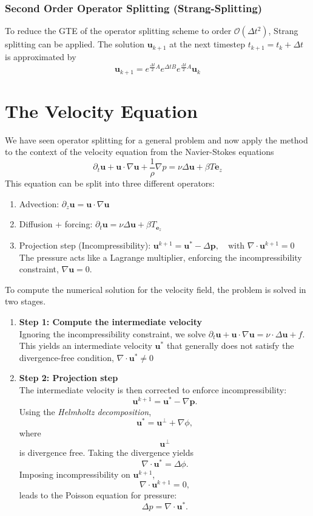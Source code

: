 \subsubsection{Second Order Operator Splitting (Strang-Splitting)}
To reduce the GTE of the operator splitting scheme to order
$\mathcal{O}(\Delta t^2)$, Strang splitting can be applied. The solution
$\bm{u}_{k+1}$ at the next timestep $t_{k+1}=t_k +\Delta t$ is
approximated by
\begin{equation}
    \bm{u}_{k+1}=e^{\frac{\Delta t}{2}A} e^{\Delta t B}
        e^{\frac{\Delta t}{2}A} \bm{u}_k
\end{equation}

\section{The Velocity Equation}
We have seen operator splitting for a general problem and now apply the
method to the context of the velocity equation from the Navier-Stokes
equations
$$ \partial_t \bm{u} + \bm{u} \cdot \nabla \bm u + \frac{1}{\rho}\nabla p
= \nu \Delta \bm{u} + \beta T\bm{e}_z $$
This equation can be split into three different operators:
\begin{enumerate}
    \item{Advection: $\partial_z \bm{u} = \bm{u}\cdot \nabla \bm{u}$}
    \item {Diffusion + forcing: $\partial_t \bm {u} = \nu \Delta \bm{u}
            + \beta T_{\bm{e}_z}$}
    \item {Projection step (Incompressibility): $\bm{u}^{k+1}= \bm{u}^*-
            \Delta \bm{p}, \quad \text{with } \nabla \cdot \bm{u}^{k+1}=0$
             \\ The pressure acts like a Lagrange multiplier, enforcing
             the incompressibility constraint, $\nabla \bm{u}=0.$}
    
\end{enumerate}
To compute the numerical solution for the velocity field, the problem is
solved in two stages.
\begin{enumerate}
    \item{\textbf{Step 1: Compute the intermediate velocity} \\ Ignoring the
        incompressibility constraint, we solve $\partial_t \bm{u}+\bm{u}
        \cdot \nabla \bm{u} = \nu \cdot \Delta \bm{u} + f$. This yields an
        intermediate velocity $\bm u^*$ that generally does not satisfy
        the divergence-free condition, $\nabla \cdot \bm u^* \neq 0$}
    
    \item{\textbf{Step 2: Projection step} \\ The intermediate velocity is
    then corrected to enforce incompressibility: $$ \bm{u}^{k+1} = 
    \bm{u}^*-\nabla \bm{p}.$$ Using the \textit{Helmholtz decomposition},
    $$\bm{u}^* = \bm{u}^\perp + \nabla \phi,$$ where $$\bm{u}^{\perp}$$ is
    divergence free. Taking the divergence yields $$\nabla \cdot \bm{u}^* 
    = \Delta \phi.$$ Imposing incompressibility on $\bm{u}^{k+1}$, 
    $$\nabla \cdot \bm{u}^{k+1} = 0,$$ leads to the Poisson equation for pressure: $$\Delta p = \nabla \cdot \bm{u}^*.$$}
\end{enumerate}


